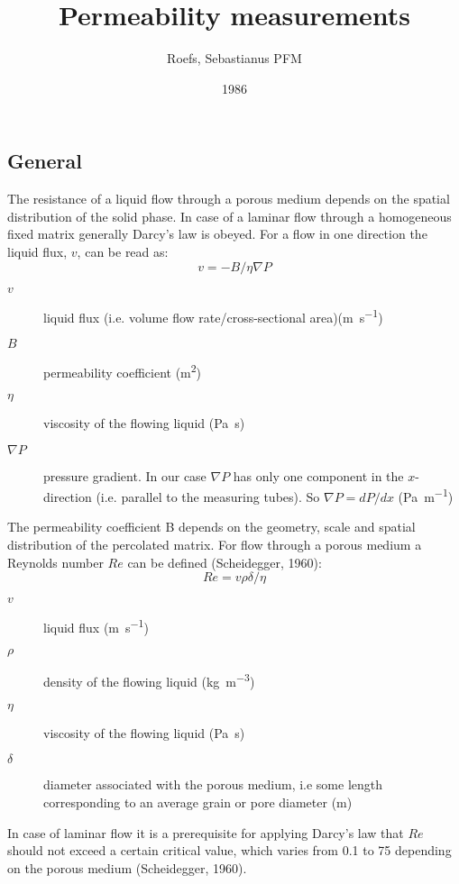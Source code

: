 \documentclass[12pt,a4paper]{article}
\author{Roefs, Sebastianus PFM}
\title{Permeability measurements}
\date{1986}
\begin{document}
\maketitle

\subsection*{General}
The resistance of a liquid flow through a porous medium depends on the spatial distribution of the solid phase. In case of a laminar flow through a homogeneous fixed matrix generally Darcy's law is obeyed. For a flow in one direction the liquid flux, $v$, can be read as:
\begin{equation}
v = -B/\eta \nabla P
\label{eq:Darcy}
\end{equation}
\begin{description}
\item[$v$] liquid flux (i.e. volume flow rate/cross-sectional area)(\si{\metre\per\second})
\item[$B$] permeability coefficient (\si{\metre^2})
\item[$\eta$] viscosity of the flowing liquid (\si{\pascal\second})
\item[$\nabla P$] pressure gradient. In our case $\nabla P$ has only one component in the $x$-direction (i.e. parallel to the measuring tubes). So $\nabla P = dP/dx$ (\si{\pascal\per\metre})
\end{description}

The permeability coefficient B depends on the geometry, scale and spatial distribution of the percolated matrix. For flow through a porous medium a Reynolds number $Re$ can be defined (Scheidegger, 1960):
\begin{equation}
Re = v\rho\delta/\eta
\label{eq:Reynolds}
\end{equation}
\begin{description}
\item[$v$] liquid flux (\si{\metre\per\second})
\item[$\rho$] density of the flowing liquid (\si{\kilo\gram\per\cubic\metre})
\item[$\eta$] viscosity of the flowing liquid (\si{\pascal\second})
\item[$\delta$] diameter associated with the porous medium, i.e some length corresponding to an average grain or pore diameter (\si{\metre})
\end{description}

In case of laminar flow it is a prerequisite for applying Darcy's law that $Re$ should not exceed a certain critical value, which varies from 0.1 to 75 depending on the porous medium (Scheidegger, 1960).
\end{document}

